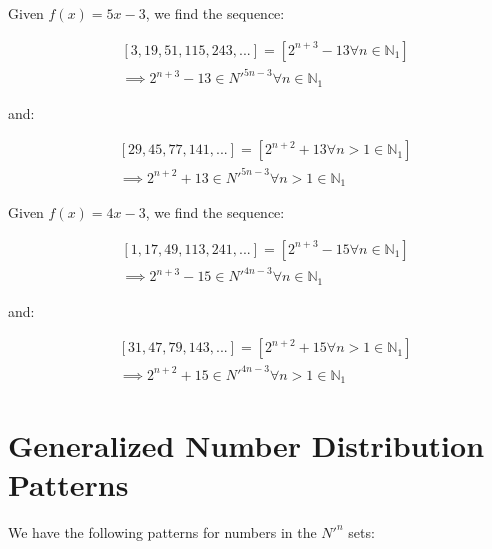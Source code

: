 \documentclass{article}
\begin{document}
\noindent
Given \begin{math}f(x)=5x-3\end{math}, we find the sequence:

\begin{displaymath}\begin{aligned}
& [3, 19, 51, 115, 243, ...] = [2^{n+3}-13 \forall n \in \mathbb{N}_{1}] \\
& \implies 2^{n+3}-13 \in N'^{5n-3} \forall n \in \mathbb{N}_{1}
\end{aligned}\end{displaymath}

\noindent
and:

\begin{displaymath}\begin{aligned}
& [29, 45, 77, 141, ...] = [2^{n+2}+13 \forall n>1 \in \mathbb{N}_{1}] \\
& \implies 2^{n+2}+13 \in N'^{5n-3} \forall n>1 \in \mathbb{N}_{1}
\end{aligned}\end{displaymath}

\noindent
Given \begin{math}f(x)=4x-3\end{math}, we find the sequence:

\begin{displaymath}\begin{aligned}
& [1, 17, 49, 113, 241, ...] = [2^{n+3}-15 \forall n \in \mathbb{N}_{1}] \\
& \implies 2^{n+3}-15 \in N'^{4n-3} \forall n \in \mathbb{N}_{1}
\end{aligned}\end{displaymath}

\noindent
and:

\begin{displaymath}\begin{aligned}
& [31, 47, 79, 143, ...] = [2^{n+2}+15 \forall n>1 \in \mathbb{N}_{1}] \\
& \implies 2^{n+2}+15 \in N'^{4n-3} \forall n>1 \in \mathbb{N}_{1}
\end{aligned}\end{displaymath}

\section{Generalized Number Distribution Patterns}

We have the following patterns for numbers in the \begin{math}N'^n\end{math}
sets:
\end{document}
